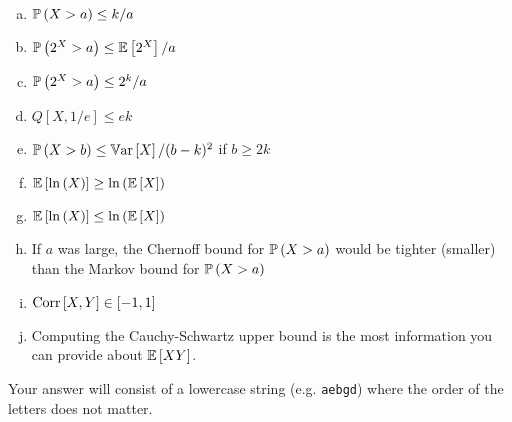 \documentclass[12pt,landscape]{article}
\newcommand{\instr}{\small Your answer will consist of a lowercase string (e.g. \texttt{aebgd}) where the order of the letters does not matter. \normalsize}
\begin{document}
\begin{enumerate}[(a)]
\item $\mathbb{P}\left(X > a\right) \leq k / a$
\item $\mathbb{P}\left(2^X > a\right) \leq \mathbb{E}\left[2^X\right] / a$
\item $\mathbb{P}\left(2^X > a\right) \leq 2^k / a$
\item $Q[X, 1/e] \leq ek$
\item $\mathbb{P}\left(X > b\right) \leq \mathbb{V}\text{ar}\left[X\right] / (b-k)^2$ if $b \geq 2k$
\item $\mathbb{E}\left[\ln\left(X\right)\right] \geq \ln\left(\mathbb{E}\left[X\right]\right)$
\item $\mathbb{E}\left[\ln\left(X\right)\right] \leq \ln\left(\mathbb{E}\left[X\right]\right)$
\item If $a$ was large, the Chernoff bound for $\mathbb{P}\left(X > a\right)$ would be tighter (smaller) than the Markov bound for $\mathbb{P}\left(X > a\right)$
\item $\text{Corr}\left[X, Y\right] \in \left[-1,1\right]$
\item Computing the Cauchy-Schwartz upper bound is the most information you can provide about $\mathbb{E}\left[XY\right]$.
\end{enumerate}
\eenum\instr\pagebreak

\end{document}
